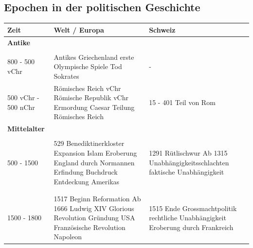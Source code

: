 \documentclass[10pt, openright=true]{scrartcl}
\begin{document}
\subsection{Epochen in der politischen Geschichte}
\begin{tabularx}{1\textwidth}{L{3cm} L{6cm} X}
 \textbf{Zeit} & \textbf{Welt / Europa} & \textbf{Schweiz} \\ 
\hline
{} \textbf{Antike} & &\\
\\
800 - 500 vChr & Antikes Griechenland  erste Olympische Spiele  Tod Sokrates \newline & -\\
500 vChr - 500 nChr & Römisches Reich  vChr Römische Republik  vChr Ermordung Caesar  Teilung Römisches Reich \newline & 15 - 401 Teil von Rom \\
 \textbf{Mittelalter} & &\\
\\
500 - 1500 & 529 Benediktinerkloster  Expansion Islam  Eroberung England durch Normannen  Erfindung Buchdruck  Entdeckung Amerikas \newline & 1291 Rütlischwur \newline Ab 1315 Unabhängigkeitsschlachten  faktische Unabhängigkeit\\
 \\
\\
1500 - 1800 & 1517 Beginn Reformation \newline Ab 1666 Ludwig XIV  Glorious Revolution  Gründung USA  Französische Revolution  Napoleon \newline & 1515 Ende Grossmachtpolitik  rechtliche Unabhängigkeit  Eroberung durch Frankreich\\

\end{tabularx}
\end{document}

